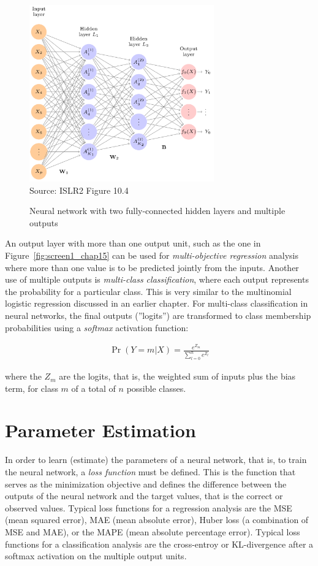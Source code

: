 \begin{figure}
\centering
\includegraphics[height=3in]{screen2.png} \\

\scriptsize Source: ISLR2 Figure 10.4
\caption{Neural network with two fully-connected hidden layers and multiple outputs}
\label{fig:screen2_chap15}
\end{figure}

An output layer with more than one output unit, such as the one in Figure~\ref{fig:screen1_chap15} can be used for \emph{multi-objective regression} analysis where more than one value is to be predicted jointly from the inputs. Another use of multiple outputs is \emph{multi-class classification}, where each output represents the probability for a particular class. This is very similar to the multinomial logistic regression discussed in an earlier chapter. For multi-class classification in neural networks, the final outputs (''logits'') are transformed to class membership probabilities using a \emph{softmax} activation function:

\begin{align*}
\Pr(Y=m|X) = \frac{e^{Z_m}}{\sum_{l=0}^n e^{Z_l}}
\end{align*}

\noindent where the $Z_m$ are the logits, that is, the weighted sum of inputs plus the bias term, for class $m$ of a total of $n$ possible classes.

\section{Parameter Estimation}

In order to learn (estimate) the parameters of a neural network, that is, to train the neural network, a \emph{loss function} must be defined. This is the function that serves as the minimization objective and defines the difference between the outputs of the neural network and the target values, that is the correct or observed values. Typical loss functions for a regression analysis are the MSE (mean squared error), MAE (mean absolute error), Huber loss (a combination of MSE and MAE), or the MAPE (mean absolute percentage error). Typical loss functions for a classification analysis are the cross-entroy or KL-divergence after a softmax activation on the multiple output units. 

